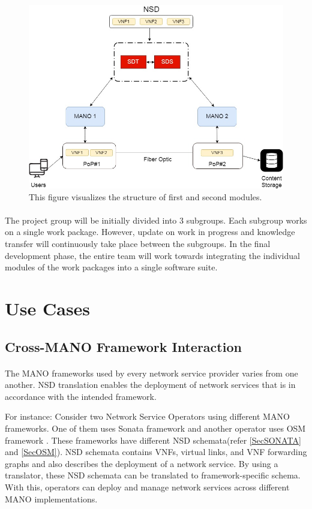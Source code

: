 \begin{figure}[h]
	\centering
	\includegraphics[width=0.7\linewidth]{figures/Structure1}
	\caption{This figure visualizes the structure of first and second modules. }
	\label{fig:structure1}
\end{figure}



\paragraph{}
The project group will be initially divided into 3 subgroups. Each subgroup works on a single work package. However, update on work in progress and knowledge transfer will continuously take place between the subgroups. In the final development phase, the entire team will work towards integrating the individual modules of the work packages into a single software suite.


\section{Use Cases}

\subsection{Cross-MANO Framework Interaction}
\paragraph{}

The MANO frameworks used by every network service provider varies from one another. NSD translation enables the deployment of network services that is in accordance with the intended framework.

For instance: Consider two Network Service Operators using different MANO frameworks. One of them uses Sonata framework \cite{draxler2017sonata} and another operator uses OSM framework \cite{ersue2013etsi}. These frameworks have different NSD schemata(refer \ref{SecSONATA} and \ref{SecOSM}). NSD schemata contains VNFs, virtual links, and VNF forwarding graphs and also describes the deployment of a network service. By using a translator, these NSD schemata can be translated to framework-specific schema. With this, operators can deploy and manage network services across different MANO implementations.

